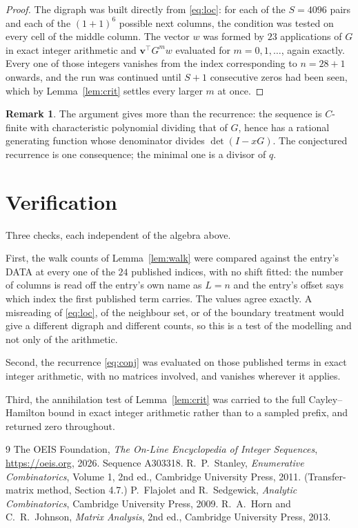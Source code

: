 \documentclass[11pt,a4paper]{article}
\theoremstyle{plain}
\theoremstyle{definition}
\newtheorem{remark}[theorem]{Remark}
\begin{document}
\begin{proof}
The digraph was built directly from \eqref{eq:loc}: for each of the $S=4096$ pairs and each
of the $(1+1)^{6}$ possible next columns, the condition was tested on every cell of
the middle column. The vector $w$ was formed by $23$ applications of $G$ in exact integer
arithmetic and $\mathbf{v}^{\!\top}G^{m}w$ evaluated for $m=0,1,\dots$, again exactly.
Every one of those integers vanishes from the index corresponding to $n=28+1$ onwards,
and the run was continued until $S+1$ consecutive zeros had been seen, which by
Lemma~\ref{lem:crit} settles every larger $m$ at once.
\end{proof}

\begin{remark}
The argument gives more than the recurrence: the sequence is $C$-finite with characteristic
polynomial dividing that of $G$, hence has a rational generating function whose denominator
divides $\det(I-xG)$. The conjectured recurrence is one consequence; the minimal one is a
divisor of $q$.
\end{remark}

\section{Verification}

Three checks, each independent of the algebra above.

First, the walk counts of Lemma~\ref{lem:walk} were compared against the entry's DATA at
every one of the $24$ published indices, with no shift fitted: the number of columns is
read off the entry's own name as $L=n$ and the entry's offset says which index the first
published term carries. The values agree exactly. A misreading of \eqref{eq:loc}, of the
neighbour set, or of the boundary treatment would give a different digraph and different
counts, so this is a test of the modelling and not only of the arithmetic.

Second, the recurrence \eqref{eq:conj} was evaluated on those published terms in exact
integer arithmetic, with no matrices involved, and vanishes wherever it applies.

Third, the annihilation test of Lemma~\ref{lem:crit} was carried to the full
Cayley--Hamilton bound in exact integer arithmetic rather than to a sampled prefix, and
returned zero throughout.

\begin{thebibliography}{9}
 The OEIS Foundation, \emph{The On-Line Encyclopedia of Integer
Sequences}, \url{https://oeis.org}, 2026. Sequence A303318.
 R.~P.~Stanley, \emph{Enumerative Combinatorics}, Volume 1, 2nd ed.,
Cambridge University Press, 2011. (Transfer-matrix method, Section 4.7.)
 P.~Flajolet and R.~Sedgewick, \emph{Analytic Combinatorics}, Cambridge
University Press, 2009.
 R.~A.~Horn and C.~R.~Johnson, \emph{Matrix Analysis}, 2nd ed., Cambridge
University Press, 2013.
\end{thebibliography}
\end{document}
